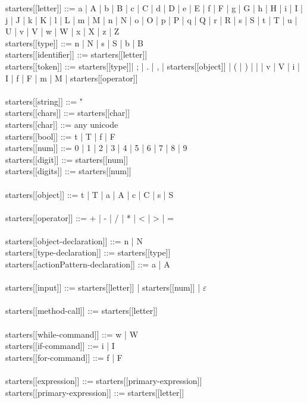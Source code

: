 starters[[letter]] ::= a | A | b | B | c | C | d | D | e | E | f | F | g | G | h | H | i | I | j | J | k | K | l | L | m | M | n | N | o | O | p | P | q | Q | r | R | s | S | t | T | u | U | v | V | w | W | x | X | z | Z \\
starters[[type]] ::= n | N | s | S | b | B \\
starters[[identifier]] ::= starters[[letter]] \\
starters[[token]] ::= starters[[type]]| ; | . | , | starters[[object]] | ( | ) | { | } | v | V | i | I | f | F | m | M | starters[[operator]] \\
\\
starters[[string]] ::= "\\
starters[[chars]] ::= starters[[char]]\\
starters[[char]] ::= any unicode\\
starters[[bool]] ::= t | T | f | F \\
starters[[num]] ::= 0 | 1 | 2 | 3 | 4 | 5 | 6 | 7 | 8 | 9 \\
starters[[digit]] ::= starters[[num]] \\
starters[[digits]] ::= starters[[num]] \\
\\
starters[[object]] ::= t | T | a | A | c | C | s | S \\
\\
starters[[operator]] ::= + | - | / | * | < | > | = \\
\\
starters[[object-declaration]] ::= n | N \\
starters[[type-declaration]] ::= starters[[type]] \\
starters[[actionPattern-declaration]] ::= a | A \\
\\
starters[[input]] ::= starters[[letter]] | starters[[num]] | $\varepsilon$ \\
\\
starters[[method-call]] ::= starters[[letter]] \\
\\
starters[[while-command]] ::= w | W \\
starters[[if-command]] ::= i | I \\
starters[[for-command]] ::= f | F \\
\\
starters[[expression]] ::= starters[[primary-expression]] \\
starters[[primary-expression]] ::= starters[[letter]] \\
